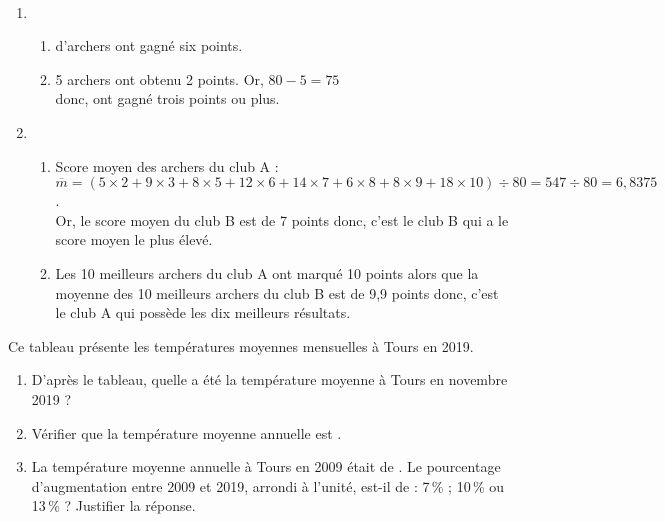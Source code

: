 \begin{colonne*exercice}
\begin{corrige}
   \ \\ [-5mm]
   \begin{enumerate}
      \item
      \begin{enumerate}
         \item { d'archers} ont gagné six points.
         \item 5 archers ont obtenu 2 points. Or, $80-5 =75$ \\
            donc, { ont gagné trois points ou plus}.
      \end{enumerate}
      \setcounter{enumi}{1}
      \item 
      \begin{enumerate}
         \item Score moyen des archers du club A : \\
            $\overline{m} =(5\times2+9\times3+8\times5+12\times6+14\times7+6\times8+8\times9+18\times10)\div80 =547\div80 =6,8375$. \\
            Or, le score moyen du club B est de 7 points donc, c'est {\blue le club B} qui a le score moyen le plus élevé.
         \item Les 10 meilleurs archers du club A ont marqué 10 points alors que la moyenne des 10 meilleurs archers du club B est de 9,9 points donc, c'est {\blue le club A} qui possède les dix meilleurs résultats.
      \end{enumerate}
   \end{enumerate}
\end{corrige}

\end{colonne*exercice}

\smallskip


\begin{exercice} %
   Ce tableau présente les températures moyennes mensuelles à Tours en 2019.
   \begin{center}
      
   \end{center}
   \begin{enumerate}
      \item D'après le tableau, quelle a été la température moyenne à Tours en novembre 2019 ?
      \item Vérifier que la température moyenne annuelle est .
      \item La température moyenne annuelle à Tours en 2009 était de . Le pourcentage d'augmentation entre 2009 et 2019, arrondi à l'unité, est-il de :  7\,\% ; 10\,\%  ou 13\,\%  ? Justifier la réponse.
   \end{enumerate}
\end{exercice}


